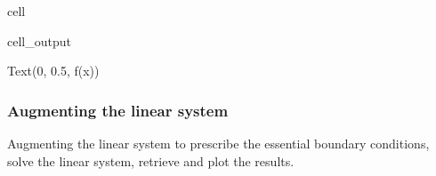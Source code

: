 \documentclass[letterpaper,10pt,english]{jupyterBook}
\begin{document}
\begin{sphinxuseclass}{cell}
\begin{sphinxVerbatimOutput}
\begin{sphinxuseclass}{cell_output}
\begin{sphinxVerbatim}[commandchars=\\\{\}]
[ 0 10]
[1 2 3 4 5 6 7 8 9]
\end{sphinxVerbatim}

\begin{sphinxVerbatim}[commandchars=\\\{\}]
Text(0, 0.5, \PYGZsq{}f(x)\PYGZsq{})
\end{sphinxVerbatim}

\noindent{}

\end{sphinxuseclass}\end{sphinxVerbatimOutput}

\end{sphinxuseclass}

\subsubsection{Augmenting the linear system}
\label{\detokenize{ch/pde/fvm-poisson-1d:augmenting-the-linear-system}}
\sphinxAtStartPar
Augmenting the linear system to prescribe the essential boundary conditions, solve the linear system, retrieve and plot the results.

\sphinxAtStartPar
{}
\end{document}
